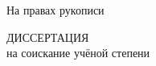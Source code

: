 \thispagestyle{empty}%
\begin{center}%
\thesisOrganization
\end{center}%
%
\vspace{0pt plus4fill} %
{
\begin{flushright}%
На правах рукописи

\end{flushright}%
}
%
\vspace{0pt plus6fill} %
\begin{center}%
{\large \thesisAuthor}
\end{center}%
%
\vspace{0pt plus1fill} %
\begin{center}%
\textbf {\large %
\thesisTitle}

\vspace{0pt plus2fill} %


\vspace{0pt plus2fill} %
ДИССЕРТАЦИЯ\\ на соискание учёной степени\\

\thesisDegree
\end{center}%
